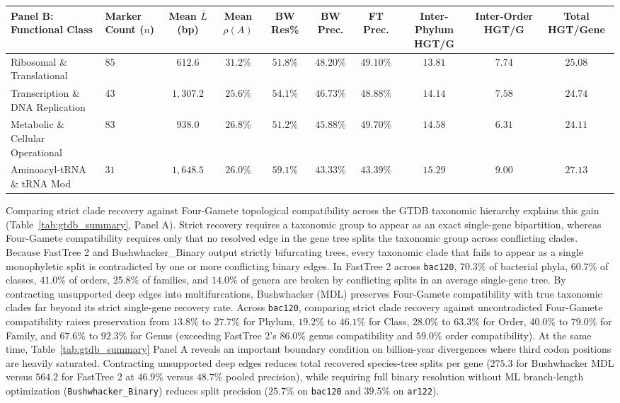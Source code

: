 \documentclass[11pt,a4paper]{article}
\begin{document}
\begin{table}[t!]
{\begin{tabular}{@{}llcccccccc@{}}
\midrule
Panel B: Functional Class & Marker Count ($n$) & Mean $\bar{L}$ (bp) & Mean $\rho(A)$ & BW Res\% & BW Prec. & FT Prec. & Inter-Phylum HGT/G & Inter-Order HGT/G & Total HGT/Gene \\
\midrule
Ribosomal \& Translational & $85$ & $612.6$ & $31.2\%$ & $51.8\%$ & $48.20\%$ & $49.10\%$ & $13.81$ & $7.74$ & $25.08$ \\
Transcription \& DNA Replication & $43$ & $1,307.2$ & $25.6\%$ & $54.1\%$ & $46.73\%$ & $48.88\%$ & $14.14$ & $7.58$ & $24.74$ \\
Metabolic \& Cellular Operational & $83$ & $938.0$ & $26.8\%$ & $51.2\%$ & $45.88\%$ & $49.70\%$ & $14.58$ & $6.31$ & $24.11$ \\
Aminoacyl-tRNA \& tRNA Mod & $31$ & $1,648.5$ & $26.0\%$ & $59.1\%$ & $43.33\%$ & $43.39\%$ & $15.29$ & $9.00$ & $27.13$ \\
\bottomrule
\end{tabular}%
}
\end{table}

Comparing strict clade recovery against Four-Gamete topological compatibility across the GTDB taxonomic hierarchy explains this gain (Table~\ref{tab:gtdb_summary}, Panel A). Strict recovery requires a taxonomic group to appear as an exact single-gene bipartition, whereas Four-Gamete compatibility requires only that no resolved edge in the gene tree splits the taxonomic group across conflicting clades. Because FastTree 2 and Bushwhacker\_Binary output strictly bifurcating trees, every taxonomic clade that fails to appear as a single monophyletic split is contradicted by one or more conflicting binary edges. In FastTree 2 across \texttt{bac120}, $70.3\%$ of bacterial phyla, $60.7\%$ of classes, $41.0\%$ of orders, $25.8\%$ of families, and $14.0\%$ of genera are broken by conflicting splits in an average single-gene tree. By contracting unsupported deep edges into multifurcations, Bushwhacker (MDL) preserves Four-Gamete compatibility with true taxonomic clades far beyond its strict single-gene recovery rate. Across \texttt{bac120}, comparing strict clade recovery against uncontradicted Four-Gamete compatibility raises preservation from $13.8\%$ to $27.7\%$ for Phylum, $19.2\%$ to $46.1\%$ for Class, $28.0\%$ to $63.3\%$ for Order, $40.0\%$ to $79.0\%$ for Family, and $67.6\%$ to $92.3\%$ for Genus (exceeding FastTree 2's $86.0\%$ genus compatibility and $59.0\%$ order compatibility). At the same time, Table~\ref{tab:gtdb_summary} Panel A reveals an important boundary condition on billion-year divergences where third codon positions are heavily saturated. Contracting unsupported deep edges reduces total recovered species-tree splits per gene ($275.3$ for Bushwhacker MDL versus $564.2$ for FastTree 2 at $46.9\%$ versus $48.7\%$ pooled precision), while requiring full binary resolution without ML branch-length optimization (\texttt{Bushwhacker\_Binary}) reduces split precision ($25.7\%$ on \texttt{bac120} and $39.5\%$ on \texttt{ar122}).
\end{document}

